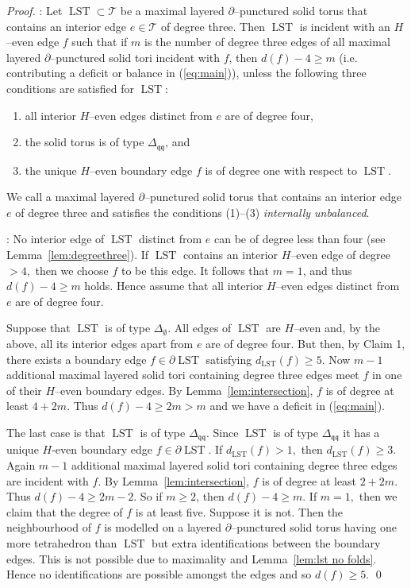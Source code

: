 \documentclass[a4paper]{gtart}
\def\lst{\operatorname{LST}}
\def\tri{\mathcal{T}}
\def\Tee{\Delta_{\emptyset}}
\def\Tqq{\Delta_{\mathfrak{qq}}}
\theoremstyle{plain}
\theoremstyle{definition}
\theoremstyle{remark}
\numberwithin{equation}{section}
\begin{document}
\begin{proof}
\medskip

: Let $\lst \subset \tri$ be a maximal layered $\partial$--punctured solid torus that contains an interior edge $ e \in \tri$ of degree three. Then $\lst$ is incident with an $H$--even edge $f$ such that if $m$ is the number of degree three edges of all maximal layered $\partial$--punctured solid tori incident with $f$, then $d(f)-4 \ge m$ (i.e. contributing a deficit or balance in (\ref{eq:main})), unless the following three conditions are satisfied for $\lst$:
\begin{enumerate}
  \item all interior $H$--even edges distinct from $e$ are of degree four, 
  \item the solid torus is of type $\Tqq$, and
  \item the unique $H$--even boundary edge $f$ is of degree one with respect to $\lst.$ 
\end{enumerate}
We call a maximal layered $\partial$--punctured solid torus that contains an interior edge $e$ of degree three and satisfies the conditions (1)--(3) {\em internally unbalanced}. 
  
\medskip

: 
No interior edge of $\lst$ distinct from $e$ can be of degree less than four (see Lemma~\ref{lem:degreethree}).
If $\lst$ contains an interior $H$--even edge of degree $> 4,$ then we choose $f$ to be this edge. It follows that $m=1$, and thus  $d(f)-4 \ge m$ holds. Hence assume that all interior $H$--even edges distinct from $e$ are of degree four.

Suppose that  $\lst$ is of type $\Tee$. All edges of $\lst$ are $H$--even and, by the above, all its interior edges apart from $e$ are of degree four. But then, by Claim 1, there exists a boundary edge $f \in \partial \lst$ satisfying $d_{\lst}(f) \geq 5$. Now
$m-1$ additional maximal layered solid tori containing degree three edges meet $f$ in one of their $H$--even boundary edges. By Lemma~\ref{lem:intersection}, $f$ is of degree at least $4 + 2m.$ Thus $d(f)-4\ge 2m > m$ and we have a deficit in (\ref{eq:main}).
 
The last case is that  $\lst$ is of type $\Tqq$.
Since $\lst$ is of type $\Tqq$ it has a unique $H$-even boundary edge $f \in \partial \lst$. If $d_{\lst}(f) > 1,$ then $d_{\lst}(f) \geq 3.$ Again $m-1$ additional maximal layered solid tori containing degree three edges are incident with $f$. By Lemma~\ref{lem:intersection}, $f$ is of degree at least $2 + 2m.$ Thus $d(f) -4 \ge  2m-2.$ So if $m\ge 2$, then $d(f) -4 \ge m.$
If $m=1,$ then we claim that the degree of $f$ is at least five. Suppose it is not. Then the neighbourhood of $f$ is modelled on a layered $\partial$--punctured solid torus having one more tetrahedron than $\lst$ but extra identifications between the boundary edges. This is not possible due to maximality and Lemma~\ref{lem:lst no folds}. Hence no identifications are possible amongst the edges and so $d(f)\ge 5.$
\qed


\end{proof}
\end{document}
